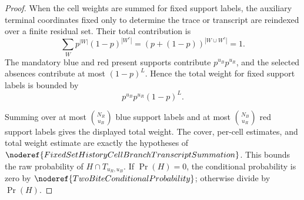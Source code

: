\begin{proof}
When the cell weights are summed for fixed support labels, the auxiliary
terminal coordinates fixed only to determine the trace or transcript are
reindexed over a finite residual set.  Their total contribution is
\[
\sum_W p^{|W|}(1-p)^{|W^c|}=(p+(1-p))^{|W\cup W^c|}=1.
\]
The mandatory blue and red present supports contribute \(p^{u_B}p^{u_R}\),
and the selected absences contribute at most \((1-p)^L\).  Hence the total
weight for fixed support labels is bounded by
\[
p^{u_B}p^{u_R}(1-p)^L.
\]

Summing over at most \(\binom{N_R}{u_B}\) blue support labels and at most
\(\binom{N_B}{u_R}\) red support labels gives the displayed total weight.
The cover, per-cell estimates, and total weight estimate are exactly the
hypotheses of \(\noderef{FixedSetHistoryCellBranchTranscriptSummation}\).
This bounds the raw probability of \(H\cap T_{u_R,u_B}\).  If \(\Pr(H)=0\),
the conditional probability is zero by
\(\noderef{TwoBiteConditionalProbability}\); otherwise divide by \(\Pr(H)\).
\end{proof}
